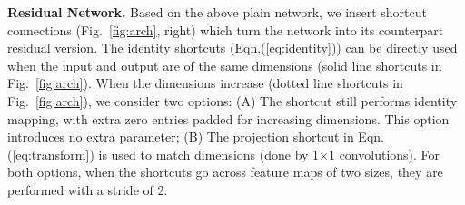 \documentclass{article}
\begin{document}
\vspace{6pt}
\noindent\textbf{Residual Network.}
Based on the above plain network, we insert shortcut connections (Fig.~\ref{fig:arch}, right) which turn the network into its counterpart residual version.
The identity shortcuts (Eqn.(\ref{eq:identity})) can be directly used when the input and output are of the same dimensions (solid line shortcuts in Fig.~\ref{fig:arch}).
When the dimensions increase (dotted line shortcuts in Fig.~\ref{fig:arch}), we consider two options:
(A) The shortcut still performs identity mapping, with extra zero entries padded for increasing dimensions. This option introduces no extra parameter;
(B) The projection shortcut in Eqn.(\ref{eq:transform}) is used to match dimensions (done by 1$\times$1 convolutions).
For both options, when the shortcuts go across feature maps of two sizes, they are performed with a stride of 2.
\end{document}
